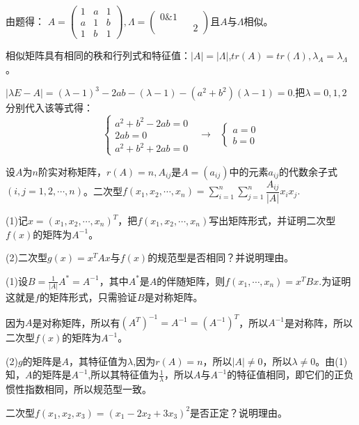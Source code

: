 \documentclass[a4paper]{report}
\begin{document}
\begin{jie}
由题得：
$
A=
\begin{pmatrix}
1&a&1\\
a&1&b\\
1&b&1
\end{pmatrix},\Lambda
=\begin{pmatrix}
0\&1\\&&2
 \end{pmatrix}
$且$A$与$\Lambda$相似。

相似矩阵具有相同的秩和行列式和特征值：$|A|=|\Lambda|$,$tr(A)=tr(\Lambda),\lambda_A=\lambda_{\Lambda}$。

$|\lambda E-A|=(\lambda-1)^3-2ab-(\lambda-1)-(a^2+b^2)(\lambda-1)=0$.把$\lambda=0,1,2$分别代入该等式得：
\begin{equation*}
\begin{cases}
a^2+b^2-2ab=0\\
2ab=0\\
a^2+b^2+2ab=0
\end{cases}~~~\rightarrow~~~
\begin{cases}
a=0\\
b=0
\end{cases}
\end{equation*}
\end{jie}

\EX 设$A$为$n$阶实对称矩阵，$r(A)=n,A_{ij}$是$A=(a_{ij})$中的元素$a_{ij}$的代数余子式$(i,j=1,2,\cdots,n)$。二次型$
f(x_1,x_2,\cdots,x_n)=\sum\limits_{i=1}^{n}\sum\limits_{j=1}^{n}\dfrac{A_{ij}}{|A|}x_ix_j.
$

(1)记$x=(x_1,x_2,\cdots,x_n)^T$，把$f(x_1,x_2,\cdots,x_n)$写出矩阵形式，并证明二次型$f(x)$的矩阵为$A^{-1}$。

(2)二次型$g(x)=x^TAx$与$f(x)$的规范型是否相同？并说明理由。

\begin{zhengming}
(1)设$B=
\frac{1}{|A|}A^*=A^{-1}
$，其中$A^*$是$A$的伴随矩阵，则$f(x_1,\cdots,x_n)=x^TBx$.为证明这就是$f$的矩阵形式，只需验证$B$是对称矩阵。

因为$A$是对称矩阵，所以有$(A^T)^{-1}=A^{-1}=(A^{-1})^T$，所以$A^{-1}$是对称阵，所以二次型$f(x)$的矩阵为$A^{-1}$。

(2)$g$的矩阵是$A$，其特征值为$\lambda$,因为$r(A)=n$，所以$|A|\neq0$，所以$\lambda\neq0$。由(1)知，$A$的矩阵是$A^{-1}$,所以其特征值为$\frac{1}{\lambda}$，所以$A$与$A^{-1}$的特征值相同，即它们的正负惯性指数相同，所以规范型一致。
\end{zhengming}

\EX 二次型$f(x_1,x_2,x_3)=(x_1-2x_2+3x_3)^2$是否正定？说明理由。
\end{document}
